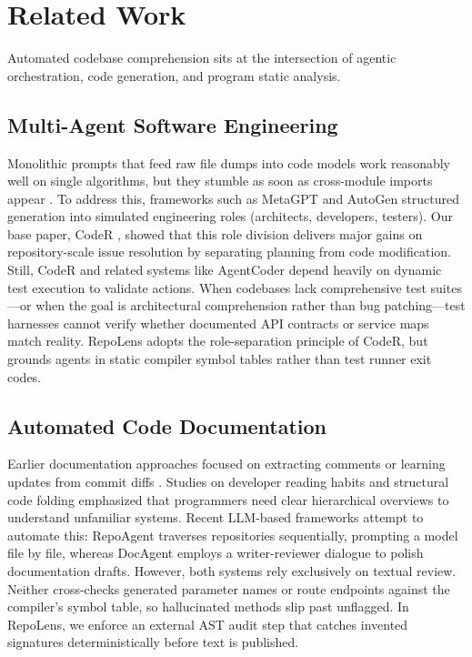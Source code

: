 \documentclass[conference]{IEEEtran}
\begin{document}
\section{Related Work}
Automated codebase comprehension sits at the intersection of agentic orchestration, code generation, and program static analysis.

\subsection{Multi-Agent Software Engineering}
Monolithic prompts that feed raw file dumps into code models \cite{chen2021codex,roziere2023code} work reasonably well on single algorithms, but they stumble as soon as cross-module imports appear \cite{swebench2024,sweagent2024}. To address this, frameworks such as MetaGPT \cite{hong2023metagpt} and AutoGen \cite{wu2023autogen} structured generation into simulated engineering roles (architects, developers, testers). Our base paper, CodeR \cite{coder2025}, showed that this role division delivers major gains on repository-scale issue resolution by separating planning from code modification. Still, CodeR and related systems like AgentCoder \cite{huang2023agentcoder} depend heavily on dynamic test execution to validate actions. When codebases lack comprehensive test suites—or when the goal is architectural comprehension rather than bug patching—test harnesses cannot verify whether documented API contracts or service maps match reality. RepoLens adopts the role-separation principle of CodeR, but grounds agents in static compiler symbol tables rather than test runner exit codes.

\subsection{Automated Code Documentation}
Earlier documentation approaches focused on extracting comments or learning updates from commit diffs \cite{panthaplackel2021doc}. Studies on developer reading habits \cite{treude2011task} and structural code folding \cite{fowkes2016autofold} emphasized that programmers need clear hierarchical overviews to understand unfamiliar systems. Recent LLM-based frameworks attempt to automate this: RepoAgent \cite{repoagent2024} traverses repositories sequentially, prompting a model file by file, whereas DocAgent \cite{docagent2025} employs a writer-reviewer dialogue to polish documentation drafts. However, both systems rely exclusively on textual review. Neither cross-checks generated parameter names or route endpoints against the compiler's symbol table, so hallucinated methods slip past unflagged. In RepoLens, we enforce an external AST audit step that catches invented signatures deterministically before text is published.
\end{document}
